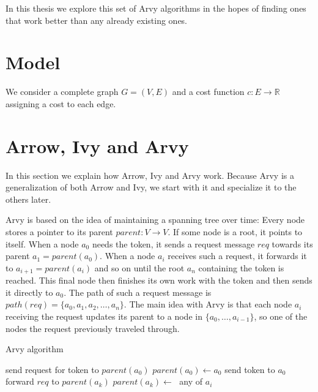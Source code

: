 \documentclass[a4paper, oneside]{discothesis}
\begin{document}
In this thesis we explore this set of Arvy algorithms in the hopes of finding ones that work better than any already existing ones.

\section{Model}

We consider a complete graph $G=(V,E)$ and a cost function $c : E \rightarrow \mathbb{R}$ assigning a cost to each edge.

\section{Arrow, Ivy and Arvy}

In this section we explain how Arrow, Ivy and Arvy work. Because Arvy is a generalization of both Arrow and Ivy, we start with it and specialize it to the others later.

Arvy is based on the idea of maintaining a spanning tree over time: Every node stores a pointer to its parent $parent : V \rightarrow V$. If some node is a root, it points to itself. When a node $a_0$ needs the token, it sends a request message $req$ towards its parent $a_1=parent(a_0)$. When a node $a_i$ receives such a request, it forwards it to $a_{i+1}=parent(a_i)$ and so on until the root $a_n$ containing the token is reached. This final node then finishes its own work with the token and then sends it directly to $a_0$. The path of such a request message is $path(req)=\{a_0, a_1, a_2, \dots, a_n\}$. The main idea with Arvy is that each node $a_i$ receiving the request updates its parent to a node in $\{a_0, \dots, a_{i-1}\}$, so one of the nodes the request previously traveled through.

\begin{algorithm}
\caption{Arvy algorithm}
\label{test}
\begin{algorithmic}

    \State send request for token to $parent(a_0)$
    \State $parent(a_0)\gets a_0$
\EndIf
\EndFunction
{}
    \State send token to $a_0$
\Else
    \State forward $req$ to $parent(a_k)$
\EndIf
\State $parent(a_k)\gets\;$
\EndFunction
{}
\State\Return any of $a_i$
\EndFunction
\end{algorithmic}
\end{algorithm}
\end{document}
